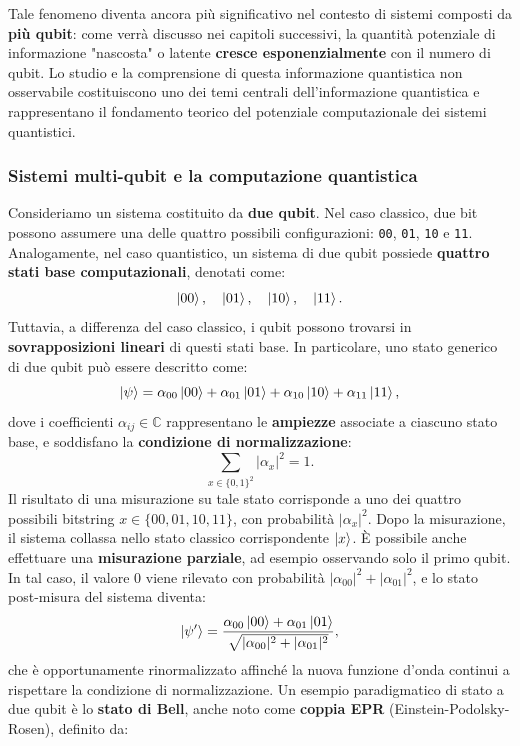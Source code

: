 \documentclass[a4paper,12pt]{report}
\theoremstyle{plain}
\begin{document}
Tale fenomeno diventa ancora più significativo nel contesto di sistemi composti da \textbf{più qubit}: come verrà discusso nei capitoli successivi, la quantità potenziale di informazione "nascosta" o latente \textbf{cresce esponenzialmente} con il numero di qubit. Lo studio e la comprensione di questa informazione quantistica non osservabile costituiscono uno dei temi centrali dell'informazione quantistica e rappresentano il fondamento teorico del potenziale computazionale dei sistemi quantistici.
\subsubsection{Sistemi multi-qubit e la computazione quantistica}
Consideriamo un sistema costituito da \textbf{due qubit}. Nel caso classico, due bit possono assumere una delle quattro possibili configurazioni: \texttt{00}, \texttt{01}, \texttt{10} e \texttt{11}. Analogamente, nel caso quantistico, un sistema di due qubit possiede \textbf{quattro stati base computazionali}, denotati come:
\[
\ket{00}, \quad \ket{01}, \quad \ket{10}, \quad \ket{11}.
\]
Tuttavia, a differenza del caso classico, i qubit possono trovarsi in \textbf{sovrapposizioni lineari} di questi stati base. In particolare, uno stato generico di due qubit può essere descritto come:
\begin{equation}
\ket{\psi} = \alpha_{00}\ket{00} + \alpha_{01}\ket{01} + \alpha_{10}\ket{10} + \alpha_{11}\ket{11},
\end{equation}
dove i coefficienti $\alpha_{ij} \in \mathbb{C}$ rappresentano le \textbf{ampiezze} associate a ciascuno stato base, e soddisfano la \textbf{condizione di normalizzazione}:
\[
\sum_{x \in \{0,1\}^2} |\alpha_x|^2 = 1.
\]
Il risultato di una misurazione su tale stato corrisponde a uno dei quattro possibili bitstring $x \in \{00, 01, 10, 11\}$, con probabilità $|\alpha_x|^2$. Dopo la misurazione, il sistema collassa nello stato classico corrispondente $\ket{x}$.
È possibile anche effettuare una \textbf{misurazione parziale}, ad esempio osservando solo il primo qubit. In tal caso, il valore 0 viene rilevato con probabilità $|\alpha_{00}|^2 + |\alpha_{01}|^2$, e lo stato post-misura del sistema diventa:
\begin{equation}
\ket{\psi'} = \frac{\alpha_{00}\ket{00} + \alpha_{01}\ket{01}}{\sqrt{|\alpha_{00}|^2 + |\alpha_{01}|^2}},
\end{equation}
che è opportunamente rinormalizzato affinché la nuova funzione d'onda continui a rispettare la condizione di normalizzazione.
Un esempio paradigmatico di stato a due qubit è lo \textbf{stato di Bell}, anche noto come \textbf{coppia EPR} (Einstein-Podolsky-Rosen), definito da:
\end{document}
